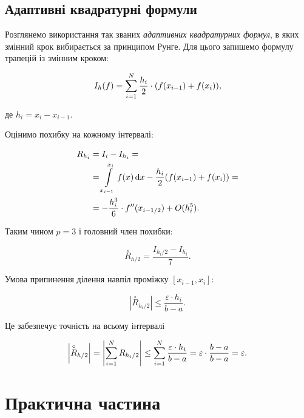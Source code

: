 \subsection{Адаптивні квадратурні формули}

Розглянемо використання так званих \textit{адаптивних квадратурних формул}, в яких змінний крок вибирається за принципом Рунге. Для цього запишемо формулу трапецій із змінним кроком:

\begin{equation}
	I_h(f) = \displaystyle\sum\limits_{i = 1}^N \frac{h_i}{2} \cdot (f(x_{i-1}) + f(x_i)),
\end{equation}

де $h_i = x_i - x_{i-1}$. \medskip

Оцінимо похибку на кожному інтервалі:

\begin{equation}
	\begin{aligned}
		R_{h_i} &= I_i - I_{h_i} = \\
		&= \displaystyle\int\limits_{x_{i - 1}}^{x_i} f(x) \mathop{}\!\mathrm{d} x - \frac{h_i}{2} (f(x_{i-1}) + f(x_i)) = \\
		&=  - \frac{h_i^3}{6} \cdot f''(x_{i-1/2}) + O(h_i^5).
	\end{aligned}
\end{equation}

Таким чином $p = 3$ і головний член похибки:

\begin{equation}
	\overset{\circ} R_{h/2} = \frac{I_{h_i/2} - I_{h_i}}{7}.
\end{equation}

Умова припинення ділення навпіл проміжку $[x_{i-1}, x_i]$:

\begin{equation}
	\left| \overset{\circ} R_{h_i/2} \right| \le \frac{\varepsilon \cdot h_i}{b - a}.
\end{equation}

Це забезпечує точність на всьому інтервалі

\begin{equation}
	\left| \overset{\circ} R_{h/2} \right| = \left| \displaystyle\sum\limits_{i=1}^N R_{h_i/2} \right| \le \displaystyle\sum\limits_{i=1}^N \frac{\varepsilon \cdot h_i}{b - a} = \varepsilon \cdot \frac{b - a}{b - a} = \varepsilon.
\end{equation}

\section{Практична частина}

